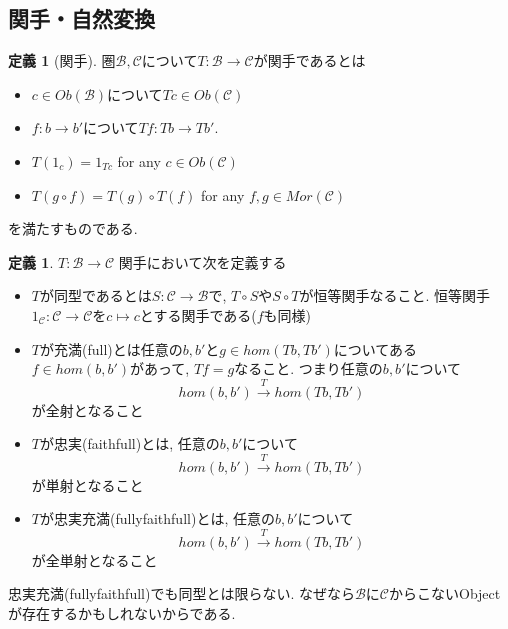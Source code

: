 \documentclass[dvipdfmx,a4paper,11pt]{article}
\theoremstyle{definition}
\newtheorem{dfn}[thm]{定義}
\begin{document}
\subsection{関手・自然変換}


 \begin{tcolorbox}
 [colback = white, colframe = green!35!black, fonttitle = \bfseries,breakable = true]
\begin{dfn}[関手]
圏$\mathcal{B}, \mathcal{C}$について$T : \mathcal{B} \to\mathcal{C}$が関手であるとは
\begin{itemize}
\item $c \in Ob(\mathcal{B})$について$Tc \in Ob(\mathcal{C})$
\item $f : b \to b'$について$Tf : Tb \to Tb'$.
\item $T(1_{c}) = 1_{Tc}$ for any $c \in Ob(\mathcal{C})$
\item $T(g \circ f) = T(g) \circ T(f)$ for any $f,g \in Mor(\mathcal{C})$
\end{itemize}
を満たすものである.
\end{dfn}
\end{tcolorbox}


 \begin{tcolorbox}
 [colback = white, colframe = green!35!black, fonttitle = \bfseries,breakable = true]
\begin{dfn}
$T : \mathcal{B} \to\mathcal{C}$ 関手において次を定義する
\begin{itemize}
\item $T$が同型であるとは$S : \mathcal{C} \to \mathcal{B}$で, $T \circ S$や$S \circ T$が恒等関手なること. 
恒等関手$1_{\mathcal{C}} : \mathcal{C} \to \mathcal{C}$を$c \mapsto c$とする関手である($f$も同様)
\item $T$が充満(full)とは任意の$b, b'$と$g \in hom(Tb, Tb')$についてある$f \in hom(b,b')$があって, $Tf =g$なること. つまり任意の$b, b'$について
$$
hom(b,b')
\overset{T}{\longrightarrow}
hom(Tb, Tb')
$$
が全射となること
\item $T$が忠実(faithfull)とは, 任意の$b, b'$について
$$
hom(b,b')
\overset{T}{\longrightarrow}
hom(Tb, Tb')
$$
が単射となること
\item $T$が忠実充満(fullyfaithfull)とは, 任意の$b, b'$について
$$
hom(b,b')
\overset{T}{\longrightarrow}
hom(Tb, Tb')
$$
が全単射となること
\end{itemize}
\end{dfn}
 \end{tcolorbox}

忠実充満(fullyfaithfull)でも同型とは限らない. なぜなら$\mathcal{B}$に$\mathcal{C}$からこないObjectが存在するかもしれないからである. 
\end{document}
